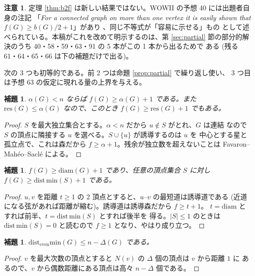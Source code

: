 \documentclass[paper=a4,fontsize=10.5pt,jafontsize=10.5pt]{jlreq}
\theoremstyle{plain}
\newtheorem{lemma}[theorem]{補題}
\theoremstyle{definition}
\newtheorem{remark}[theorem]{注意}
\begin{document}
\begin{remark}\label{rem:credit}
定理 \ref{thm:b2f} は新しい結果ではない。WOWII の予想 40 には出題者自身の注記
「\textit{For a connected graph on more than one vertex it is easily shown that
$f(G) \ge b(G)/2 + 1$}」があり \cite{wowii}、同じ不等式が「容易に示せる」もの
として述べられている。本稿がこれを改めて明示するのは、第 \ref{sec:partial}
節の部分的解決のうち 40・58・59・63・91 の 5 本がこの 1 本から出るためで
ある (残る 61・64・65・66 は下の補題だけで出る)。
\end{remark}

次の 3 つも初等的である。前 2 つは命題 \ref{prop:partial} で繰り返し使い、
3 つ目は予想 63 の仮定に現れる量の上界を与える。

\begin{lemma}\label{lem:alpha}
$\alpha(G) < n$ ならば $f(G) \ge \alpha(G) + 1$ である。また
$\mathrm{res}(G) \le \alpha(G)$ \cite{fms1991} なので、このとき
$f(G) \ge \mathrm{res}(G) + 1$ でもある。
\end{lemma}

\begin{proof}
$S$ を最大独立集合とする。$\alpha < n$ だから $u \notin S$ がとれ、$G$ は連結
なので $S$ の頂点に隣接する $u$ を選べる。$S \cup \{u\}$ が誘導するのは $u$ を
中心とする星と孤立点で、これは森だから $f \ge \alpha + 1$。残余が独立数を超えないことは
Favaron--Mahéo--Saclé \cite{fms1991} による。
\end{proof}

\begin{lemma}\label{lem:geo}
$f(G) \ge \mathrm{diam}(G) + 1$ であり、任意の頂点集合 $S$ に対し
$f(G) \ge \mathrm{dist\,min}(S) + 1$ である。
\end{lemma}

\begin{proof}
$u, v$ を距離 $t \ge 1$ の 2 頂点とすると、$u$--$v$ の最短道は誘導道である
(近道になる弦があれば距離が縮む)。誘導道は誘導森だから $f \ge t + 1$。
$t = \mathrm{diam}$ とすれば前半、$t = \mathrm{dist\,min}(S)$ とすれば後半を
得る。$|S| \le 1$ のときは $\mathrm{dist\,min}(S) = 0$ と読むので $f \ge 1$
となり、やはり成り立つ。
\end{proof}

\begin{lemma}\label{lem:deven}
$\mathrm{dist_{even}min}(G) \le n - \Delta(G)$ である。
\end{lemma}

\begin{proof}
$v$ を最大次数の頂点とすると $N(v)$ の $\Delta$ 個の頂点は $v$ から距離 $1$ に
あるので、$v$ から偶数距離にある頂点は高々 $n - \Delta$ 個である。
\end{proof}
\end{document}
